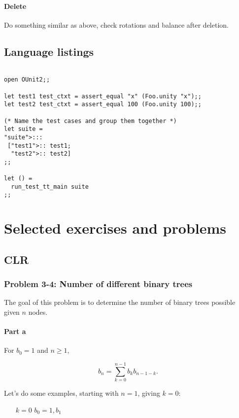\documentclass{article}
\begin{document}
\paragraph{Delete}

Do something similar as above, check
rotations and balance after deletion.


\subsection{Language listings}

\begin{lstlisting}[frame=single]  % Start your code-block

open OUnit2;;

let test1 test_ctxt = assert_equal "x" (Foo.unity "x");;
let test2 test_ctxt = assert_equal 100 (Foo.unity 100);;

(* Name the test cases and group them together *)
let suite =
"suite">:::
 ["test1">:: test1;
  "test2">:: test2]
;;

let () =
  run_test_tt_main suite
;;
\end{lstlisting}

\section{Selected exercises and problems}


\subsection{CLR}

\subsubsection{Problem 3-4: Number of different binary trees}

The goal of this problem is to determine the number of binary
trees possible given $n$ nodes.

\paragraph{Part a} For $b_0 = 1$ and $n \geq 1$,

\[
b_n = \sum_{k=0}^{n-1} b_kb_{n-1-k}.
\]

Let's do some examples, starting with $n = 1$, giving $k = 0$:

\begin{itemize}
\item [$k=0$] $b_0 = 1, b_1$
\end{itemize}
\end{document}
